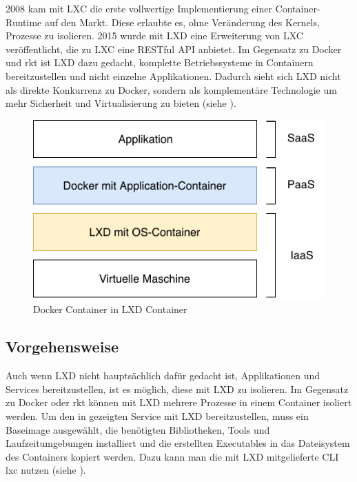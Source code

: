 2008 kam mit LXC die erste vollwertige Implementierung einer Container-Runtime auf den Markt. Diese erlaubte es, ohne Veränderung des Kernels, Prozesse zu isolieren. 2015 wurde mit LXD eine Erweiterung von LXC veröffentlicht, die zu LXC eine RESTful API anbietet. Im Gegensatz zu Docker und rkt ist LXD dazu gedacht, komplette Betriebssysteme in Containern bereitzustellen und nicht einzelne Applikationen. Dadurch sieht sich LXD nicht als direkte Konkurrenz zu Docker, sondern als komplementäre Technologie um mehr Sicherheit und Virtualisierung zu bieten \citep{TheLXDContainerHypervisor} (siehe ).

\begin{figure}[h]
	\begin{center}
		\includegraphics[]{bilder/cloud-stack.pdf}
		\caption{Docker Container in LXD Container}
		\label{fig:cloudStack}		
	\end{center}
\end{figure}

\subsection{Vorgehensweise}
\label{sec:compLXDVorgehen}

Auch wenn LXD nicht hauptsächlich dafür gedacht ist, Applikationen und Services bereitzustellen, ist es möglich, diese mit LXD zu isolieren. Im Gegensatz zu Docker oder rkt können mit LXD mehrere Prozesse in einem Container isoliert werden. Um den in  gezeigten Service mit LXD bereitzustellen, muss ein Baseimage ausgewählt, die benötigten Bibliotheken, Tools und Laufzeitumgebungen installiert und die erstellten Executables in das Dateisystem des Containers kopiert werden. Dazu kann man die mit LXD mitgelieferte CLI lxc nutzen (siehe ).

